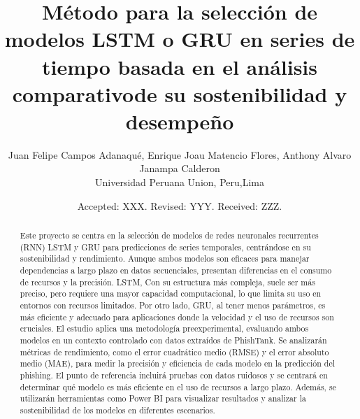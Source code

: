 \documentclass[usenatbib]{tjaa}
\title[Short Title max 45 chars]{Método para la selección de modelos LSTM o GRU \newline en series de tiempo basada en el análisis comparativo\newline de su sostenibilidad y desempeño}%
\author[F. Author \others]{%
Juan Felipe Campos Adanaqué\autid{1}{0009-0003-6571-3554},
Enrique Joau Matencio Flores\autid{2}{0009-0008-8776-8501},
\newauthor
Anthony Alvaro Janampa Calderon \autid{3}{0009-0005-9097-8858}
\\
\adrid{1}Universidad Peruana Union, Peru,Lima%
}%
\date{Accepted: XXX. Revised: YYY. Received: ZZZ.}
\begin{document}
\label{firstpage}
\pagerange{\pageref{firstpage}--\pageref{lastpage}}

\begin{abstract}%
%
Este proyecto se centra en la selección de modelos de redes neuronales recurrentes (RNN) LSTM y GRU para predicciones de series temporales, centrándose en su sostenibilidad y rendimiento. Aunque ambos modelos son eficaces para manejar dependencias a largo plazo en datos secuenciales, presentan diferencias en el consumo de recursos y la precisión. LSTM, 
Con su estructura más compleja, suele ser más preciso, pero requiere una mayor capacidad computacional, lo que limita su uso en entornos con recursos limitados. Por otro lado, GRU, al tener menos parámetros, es más eficiente y adecuado para aplicaciones donde la velocidad y el uso de recursos son cruciales. 
El estudio aplica una metodología preexperimental, evaluando ambos modelos en un contexto controlado con datos extraídos de PhishTank. Se analizarán métricas de rendimiento, como el error cuadrático medio (RMSE) y el error absoluto medio (MAE), para medir la precisión y eficiencia de cada modelo en la predicción del phishing. 
El punto de referencia incluirá pruebas con datos ruidosos y se centrará en determinar qué modelo es más eficiente en el uso de recursos a largo plazo. Además, se utilizarán herramientas como Power BI para visualizar resultados y analizar la sostenibilidad de los modelos en diferentes escenarios.
\end{abstract}
\end{document}
